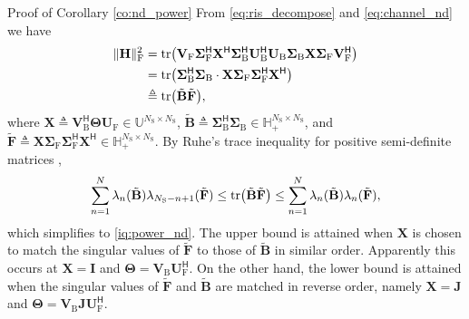 \documentclass[journal]{IEEEtran}
\begin{document}
\begin{appendix}
	\begin{subsection}{Proof of Corollary \ref{co:nd_power}}
		\label{ap:nd_power}
		From \eqref{eq:ris_decompose} and \eqref{eq:channel_nd} we have
		\begin{equation}
			\begin{split}
				\lVert \mathbf{H} \rVert _\mathrm{F}^2
				& = \operatorname{tr} \bigl(\mathbf{V}_\mathrm{F} \mathbf{\Sigma}_\mathrm{F}^\mathsf{H} \mathbf{X}^\mathsf{H} \mathbf{\Sigma}_\mathrm{B}^\mathsf{H} \mathbf{U}_\mathrm{B}^\mathsf{H} \mathbf{U}_\mathrm{B} \mathbf{\Sigma}_\mathrm{B} \mathbf{X} \mathbf{\Sigma}_\mathrm{F} \mathbf{V}_\mathrm{F}^\mathsf{H}\bigr) \\
				& = \operatorname{tr} \bigl(\mathbf{\Sigma}_\mathrm{B}^\mathsf{H} \mathbf{\Sigma}_\mathrm{B} \cdot \mathbf{X} \mathbf{\Sigma}_\mathrm{F} \mathbf{\Sigma}_\mathrm{F}^\mathsf{H} \mathbf{X}^\mathsf{H}\bigr)                                                                                                         \\
				& \triangleq \operatorname{tr} \bigl(\tilde{\mathbf{B}} \tilde{\mathbf{F}}\bigr),
			\end{split}
		\end{equation}
		where $\mathbf{X} \triangleq \mathbf{V}_\mathrm{B}^\mathsf{H} \mathbf{\Theta} \mathbf{U}_\mathrm{F} \in \mathbb{U}^{N_\mathrm{S} \times N_\mathrm{S}}$, $\tilde{\mathbf{B}} \triangleq \mathbf{\Sigma}_\mathrm{B}^\mathsf{H} \mathbf{\Sigma}_\mathrm{B} \in \mathbb{H}_+^{N_\mathrm{S} \times N_\mathrm{S}}$, and $\tilde{\mathbf{F}} \triangleq \mathbf{X} \mathbf{\Sigma}_\mathrm{F} \mathbf{\Sigma}_\mathrm{F}^\mathsf{H} \mathbf{X}^\mathsf{H} \in \mathbb{H}_+^{N_\mathrm{S} \times N_\mathrm{S}}$.
		By Ruhe's trace inequality for positive semi-definite matrices \cite[(H.1.g) and (H.1.h)]{Marshall2010},
		\begin{equation*}
			\sum_{n=1}^N \lambda_n(\tilde{\mathbf{B}}) \lambda_{N_\mathrm{S}-n+1}(\tilde{\mathbf{F}}) \le \operatorname{tr} \bigl(\tilde{\mathbf{B}} \tilde{\mathbf{F}}\bigr) \le \sum_{n=1}^N \lambda_n(\tilde{\mathbf{B}}) \lambda_n(\tilde{\mathbf{F}}),
		\end{equation*}
		which simplifies to \eqref{iq:power_nd}.
		The upper bound is attained when $\mathbf{X}$ is chosen to match the singular values of $\tilde{\mathbf{F}}$ to those of $\tilde{\mathbf{B}}$ in similar order.
		Apparently this occurs at $\mathbf{X} = \mathbf{I}$ and $\mathbf{\Theta} = \mathbf{V}_\mathrm{B} \mathbf{U}_\mathrm{F}^\mathsf{H}$.
		On the other hand, the lower bound is attained when the singular values of $\tilde{\mathbf{F}}$ and $\tilde{\mathbf{B}}$ are matched in reverse order, namely $\mathbf{X} = \mathbf{J}$ and $\mathbf{\Theta} = \mathbf{V}_\mathrm{B} \mathbf{J} \mathbf{U}_\mathrm{F}^\mathsf{H}$.
	\end{subsection}


\end{appendix}
\end{document}
